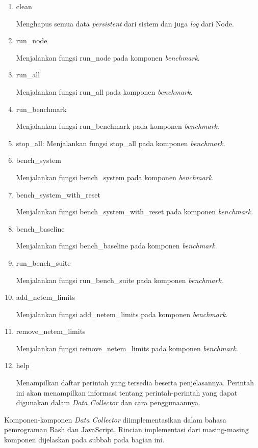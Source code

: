 \begin{enumerate}
  \item clean
  
  Menghapus semua data \textit{persistent} dari sistem dan juga \textit{log} dari Node.
  
  \item run\_node
  
  Menjalankan fungsi run\_node pada komponen \textit{benchmark}.
  
  \item run\_all
  
  Menjalankan fungsi run\_all pada komponen \textit{benchmark}.
  
  \item run\_benchmark
  
  Menjalankan fungsi run\_benchmark pada komponen \textit{benchmark}.
  
  \item stop\_all: Menjalankan fungsi stop\_all pada komponen \textit{benchmark}.
  
  \item bench\_system
  
  Menjalankan fungsi bench\_system pada komponen \textit{benchmark}.
  
  
  \item bench\_system\_with\_reset
  
  Menjalankan fungsi bench\_system\_with\_reset pada komponen \textit{benchmark}.
  
  \item bench\_baseline
  
  Menjalankan fungsi bench\_baseline pada komponen \textit{benchmark}.
  
  \item run\_bench\_suite
  
  Menjalankan fungsi run\_bench\_suite pada komponen \textit{benchmark}.
  
  \item add\_netem\_limits
  
  Menjalankan fungsi add\_netem\_limits pada komponen \textit{benchmark}.
  
  \item remove\_netem\_limits
  
  Menjalankan fungsi remove\_netem\_limits pada komponen \textit{benchmark}.
  
  \item help
  
  Menampilkan daftar perintah yang tersedia beserta penjelasannya. Perintah ini akan menampilkan informasi tentang perintah-perintah yang dapat digunakan dalam \textit{Data Collector} dan cara penggunaannya.
\end{enumerate}

Komponen-komponen \textit{Data Collector} diimplementasikan dalam bahasa pemrograman Bash dan JavaScript. Rincian implementasi dari masing-masing komponen dijelaskan pada subbab pada bagian ini.


